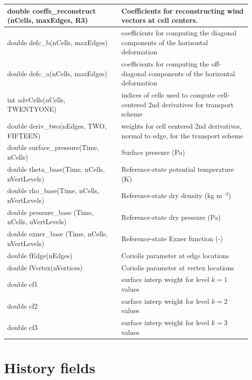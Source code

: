 \documentclass[11pt]{report}
\begin{document}
{\begin{longtable}{|p{2.5in} |p{3.75in}|}
        double coeffs\_reconstruct \hfil\break (nCells, maxEdges, R3) &   Coefficients for reconstructing wind vectors at cell centers. \\ \hline
        double defc\_b(nCells, maxEdges)                 & coefficients for computing the diagonal components \hfil\break of the horizontal deformation \\ \hline
        double defc\_a(nCells, maxEdges)                 &  coefficients for computing the off-diagonal components \hfil\break of the horizontal deformation\\ \hline
        int advCells(nCells, TWENTYONE)                  &indices of cells used to compute cell-centered 2nd derivatives for transport scheme \\ \hline
        double \hfil\break deriv\_two(nEdges, TWO, FIFTEEN)          & weights for cell centered 2nd derivatives, normal to edge, for the transport scheme \\ \hline
        double surface\_pressure(Time, nCells)           & Surface pressure (Pa) \\ \hline
        double \hfil\break theta\_base(Time, nCells, nVertLevels)    & Reference-state potential temperature (K) \\ \hline
        double \hfil\break rho\_base(Time, nCells, nVertLevels)      & Reference-state dry density (kg m$^{-3}$) \\ \hline
        double pressure\_base \hfil\break (Time, nCells, nVertLevels) & Reference-state dry pressure (Pa) \\ \hline
        double exner\_base \hfil\break (Time, nCells, nVertLevels)    & Reference-state Exner function (-) \\ \hline
        double fEdge(nEdges)         &  Coriolis parameter at edge locations \\ \hline
        double fVertex(nVertices)    &  Coriolis parameter at vertex locations \\ \hline
        double cf1                   &  surface interp weight for level $k=1$ values \\ \hline
        double cf2                   &  surface interp weight for level $k=2$ values \\ \hline
        double cf3                   &  surface interp weight for level $k=3$ values \\ \hline
\end{longtable}
}
        
\section{History fields}
\end{document}
